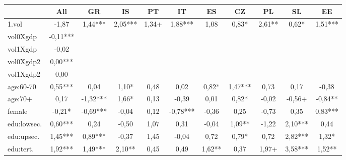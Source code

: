 {
\def\sym#1{\ifmmode^{#1}\else\(^{#1}\)\fi}
\begin{tabular}{l*{10}{c}}
\hline\hline
            &\multicolumn{1}{c}{All}&\multicolumn{1}{c}{GR}&\multicolumn{1}{c}{IS}&\multicolumn{1}{c}{PT}&\multicolumn{1}{c}{IT}&\multicolumn{1}{c}{ES}&\multicolumn{1}{c}{CZ}&\multicolumn{1}{c}{PL}&\multicolumn{1}{c}{SL}&\multicolumn{1}{c}{EE}\\
\hline
1.vol       &       -1,87   &        1,44***&        2,05***&        1,34+  &        1,88***&        1,08   &        0,83*  &        2,61** &        0,62*  &        1,51***\\
vol0Xgdp    &       -0,11***&               &               &               &               &               &               &               &               &               \\
vol1Xgdp    &       -0,02   &               &               &               &               &               &               &               &               &               \\
vol0Xgdp2   &        0,00***&               &               &               &               &               &               &               &               &               \\
vol1Xgdp2   &        0,00   &               &               &               &               &               &               &               &               &               \\
age:60-70   &        0,55***&        0,04   &        1,10*  &        0,48   &        0,02   &        0,82*  &        1,47***&        0,73   &        0,17   &       -0,38   \\
age:70+     &        0,17   &       -1,32***&        1,66*  &        0,13   &       -0,39   &        0,01   &        0,82*  &       -0,02   &       -0,56+  &       -0,84** \\
female      &       -0,21*  &       -0,69***&       -0,04   &        0,12   &       -0,78***&       -0,36   &        0,25   &       -0,73   &        0,35   &        0,83***\\
edu:lowsec. &        0,60***&        0,24   &       -0,50   &        1,07   &        0,31   &       -0,04   &        1,09** &       -1,22   &        2,10***&        0,44   \\
edu:upsec.  &        1,45***&        0,89***&       -0,37   &        1,45   &       -0,04   &        0,72   &        0,79*  &        0,72   &        2,82***&        1,32*  \\
edu:tert.   &        1,92***&        1,49***&        2,10** &        0,45   &        0,49   &        1,62** &        0,37   &        1,97+  &        3,58***&        1,52** \\

\end{tabular}}
